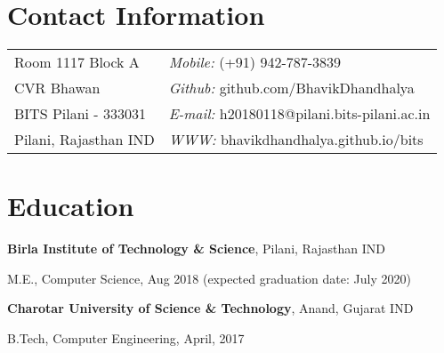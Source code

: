 \documentclass[margin,line]{res}
\newenvironment{list1}{
  \begin{list}{\ding{113}}{%
      \setlength{\itemsep}{0in}
      \setlength{\parsep}{0in} \setlength{\parskip}{0in}
      \setlength{\topsep}{0in} \setlength{\partopsep}{0in} 
      \setlength{\leftmargin}{0.17in}}}{\end{list}}
\begin{document}

\begin{resume}
\section{\sc Contact Information}
\vspace{.05in}
\begin{tabular}{@{}p{2in}p{4in}}
Room 1117 Block A             & {\it Mobile:}  (+91) 942-787-3839 \\            
CVR Bhawan   & {\it Github:}    github.com/BhavikDhandhalya \\         
BITS Pilani - 333031 & {\it E-mail:}  h20180118@pilani.bits-pilani.ac.in\\
Pilani, Rajasthan IND  & {\it WWW:} bhavikdhandhalya.github.io/bits \\     
\end{tabular}



\section{\sc Education}
{\bf Birla Institute of Technology \& Science}, Pilani, Rajasthan IND\\
\vspace*{-.1in}
\begin{list1}
\item[] M.E., Computer Science, Aug 2018 (expected
  graduation date: July 2020)
\vspace*{.05in}
\end{list1}

{\bf Charotar University of Science \& Technology}, Anand, Gujarat IND\\
\vspace*{-.1in}
\begin{list1}
\item[] B.Tech, Computer Engineering,  April, 2017
\end{list1}

%


\end{resume}
\end{document}
